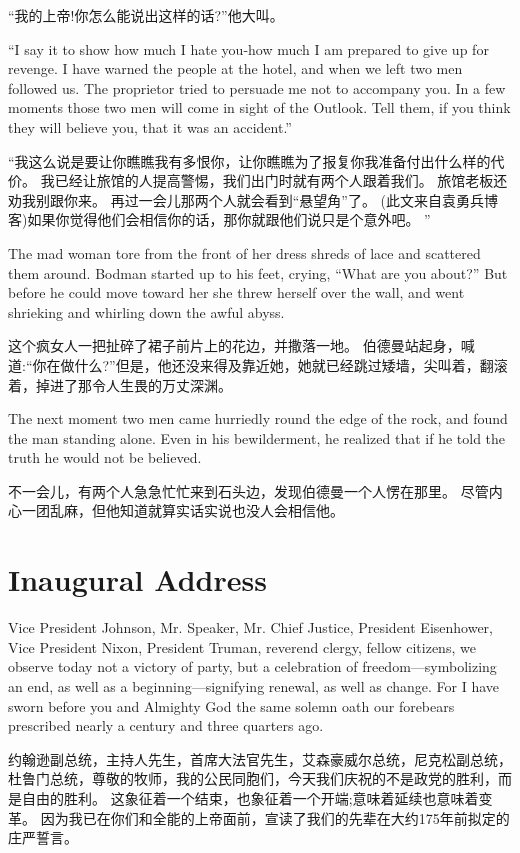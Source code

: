 \documentclass[cs4size, a4paper, 12pt]{article}
\newcounter{numpar}
\newcommand*{\newpar}{\numpar{}}
\begin{document}
	``我的上帝!你怎么能说出这样的话?''他大叫。 
	
	\newpar ``I say it to show how much I hate you-how much I am prepared to give up for revenge. I have warned the people at the hotel, and when we left two men followed us. The proprietor tried to persuade me not to accompany you. In a few moments those two men will come in sight of the Outlook. Tell them, if you think they will believe you, that it was an accident.''
	
	``我这么说是要让你瞧瞧我有多恨你，让你瞧瞧为了报复你我准备付出什么样的代价。 我已经让旅馆的人提高警惕，我们出门时就有两个人跟着我们。 旅馆老板还劝我别跟你来。 再过一会儿那两个人就会看到``悬望角''了。 (此文来自袁勇兵博客)如果你觉得他们会相信你的话，那你就跟他们说只是个意外吧。 ''
	
	\newpar The mad woman tore from the front of her dress shreds of lace and scattered them around. Bodman started up to his feet, crying, ``What are you about?'' But before he could move toward her she threw herself over the wall, and went shrieking and whirling down the awful abyss.
	
	这个疯女人一把扯碎了裙子前片上的花边，并撒落一地。 伯德曼站起身，喊道:``你在做什么?''但是，他还没来得及靠近她，她就已经跳过矮墙，尖叫着，翻滚着，掉进了那令人生畏的万丈深渊。 
	
	\newpar The next moment two men came hurriedly round the edge of the rock, and found the man standing alone. Even in his bewilderment, he realized that if he told the truth he would not be believed.
	
	不一会儿，有两个人急急忙忙来到石头边，发现伯德曼一个人愣在那里。 尽管内心一团乱麻，但他知道就算实话实说也没人会相信他。 
	
	\section{Inaugural Address}
	
	\setcounter{numpar}{0}
	
	\newpar Vice President Johnson, Mr. Speaker, Mr. Chief Justice, President Eisenhower, Vice President Nixon, President Truman, reverend clergy, fellow citizens, we observe today not a victory of party, but a celebration of freedom—symbolizing an end, as well as a beginning—signifying renewal, as well as change. For I have sworn before you and Almighty God the same solemn oath our forebears prescribed nearly a century and three quarters ago.
	
	约翰逊副总统，主持人先生，首席大法官先生，艾森豪威尔总统，尼克松副总统，杜鲁门总统，尊敬的牧师，我的公民同胞们，今天我们庆祝的不是政党的胜利，而是自由的胜利。 这象征着一个结束，也象征着一个开端;意味着延续也意味着变革。 因为我已在你们和全能的上帝面前，宣读了我们的先辈在大约175年前拟定的庄严誓言。 
	
\end{document}

